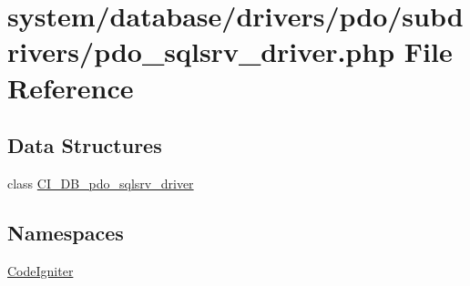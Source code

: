 \hypertarget{pdo__sqlsrv__driver_8php}{}\section{system/database/drivers/pdo/subdrivers/pdo\+\_\+sqlsrv\+\_\+driver.php File Reference}
\label{pdo__sqlsrv__driver_8php}
\subsection*{Data Structures}
\begin{DoxyCompactItemize}
\item 
class \mbox{\hyperlink{class_c_i___d_b__pdo__sqlsrv__driver}{C\+I\+\_\+\+D\+B\+\_\+pdo\+\_\+sqlsrv\+\_\+driver}}
\end{DoxyCompactItemize}
\subsection*{Namespaces}
\begin{DoxyCompactItemize}
\item 
 \mbox{\hyperlink{namespace_code_igniter}{Code\+Igniter}}
\end{DoxyCompactItemize}
